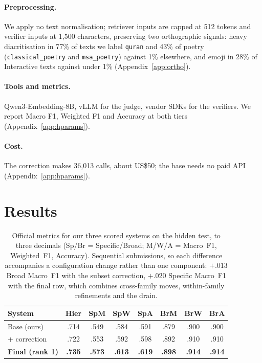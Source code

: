 \documentclass[11pt]{article}
\begin{document}
\paragraph{Preprocessing.} We apply no text normalisation; retriever inputs are capped at 512
tokens and verifier inputs at 1{,}500 characters, preserving two orthographic signals: heavy
diacritisation in 77\% of texts we label \texttt{quran} and 43\% of poetry
(\texttt{classical\_poetry} and \texttt{msa\_poetry}) against 1\% elsewhere,
and emoji in 28\% of Interactive texts against under 1\% (Appendix~\ref{app:ortho}).
\paragraph{Tools and metrics.} Qwen3-Embedding-8B, vLLM for the judge, vendor SDKs for the
verifiers. We report Macro F1, Weighted F1 and Accuracy at both tiers
(Appendix~\ref{app:hparams}).
\paragraph{Cost.} The correction makes 36{,}013 calls, about US\$50; the base needs no paid API
(Appendix~\ref{app:hparams}).

\section{Results}


\begin{table}[t]
\centering\footnotesize
\setlength{\tabcolsep}{2.6pt}
\begin{tabular}{lccccccc}
\toprule
System & Hier & SpM & SpW & SpA & BrM & BrW & BrA \\
\midrule
Base (ours) & .714 & .549 & .584 & .591 & .879 & .900 & .900 \\
\; + correction & .722 & .553 & .592 & .598 & .892 & .910 & .910 \\
\textbf{Final (rank 1)} & \textbf{.735} & \textbf{.573} & \textbf{.613} & \textbf{.619} & \textbf{.898} & \textbf{.914} & \textbf{.914} \\
\bottomrule
\end{tabular}
\caption{Official metrics for our three scored systems on the hidden test, to three decimals
(Sp/Br = Specific/Broad; M/W/A = Macro~F1, Weighted~F1, Accuracy). Sequential submissions, so each
difference accompanies a configuration change rather than one component: $+.013$ Broad
Macro~F1 with the subset correction, $+.020$ Specific Macro~F1 with the final row, which
combines cross-family moves, within-family refinements and the drain.}
\label{tab:metrics}
\end{table}
\end{document}
